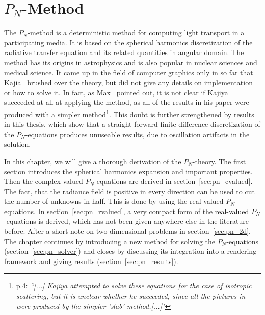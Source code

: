\chapter{$P_N$-Method}
%
\label{sec:pnmethod}

The $P_N$-method is a deterministic method for computing light transport in a participating media. It is based on the spherical harmonics discretization of the radiative transfer equation and its related quantities in angular domain. The method has its origins in astrophysics and is also popular in nuclear sciences and medical science. It came up in the field of computer graphics only in so far that Kajia~\cite{Kajiya84} brushed over the theory, but did not give any details on implementation or how to solve it. In fact, as Max~\cite{Max95} pointed out, it is not clear if Kajiya succeeded at all at applying the method, as all of the results in his paper were produced with a simpler method\footnote{\cite{Max95} p.4: \emph{``[...] Kajiya attempted to solve these equations for the case of isotropic scattering, but it is unclear whether he succeeded, since all the pictures in \cite{Kajiya84} were produced by the simpler 'slab' method.[...]"}}. This doubt is further strengthened by results in this thesis, which show that a straight forward finite difference discretization of the $P_N$-equations produces unuseable results, due to oscillation artifacts in the solution. 

In this chapter, we will give a thorough derivation of the $P_N$-theory. The first section introduces the spherical harmonics expansion and important properties. Then the complex-valued $P_N$-equations are derived in section~\ref{sec:pn_cvalued}. The fact, that the radiance field is positive in every direction can be used to cut the number of unknowns in half. This is done by using the real-valued $P_N$-equations. In section~\ref{sec:pn_rvalued}, a very compact form of the real-valued $P_N$-equations is derived, which has not been given anywhere else in the literature before. After a short note on two-dimensional problems in section~\ref{sec:pn_2d}, The chapter continues by introducing a new method for solving the $P_N$-equations (section~\ref{sec:pn_solver}) and closes by discussing its integration into a rendering framework and giving results (section~\ref{sec:pn_results}).





